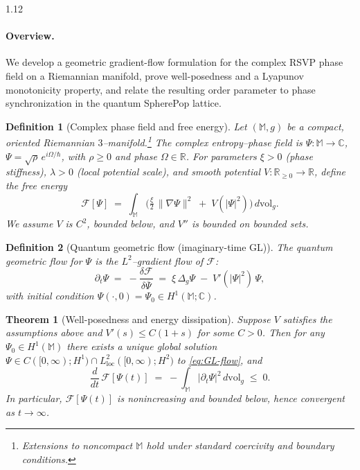 \documentclass[12pt,a4paper]{article}
\numberwithin{equation}{section}
\newtheorem{definition}{Definition}[section]
\newtheorem{theorem}{Theorem}[section]
\theoremstyle{remark}
\theoremstyle{definition}
\begin{document}
\begin{spacing}{1.12}
\paragraph{Overview.}
We develop a geometric gradient-flow formulation for the complex RSVP phase field on a Riemannian manifold, prove well-posedness and a Lyapunov monotonicity property, and relate the resulting order parameter to phase synchronization in the quantum SpherePop lattice.

\begin{definition}[Complex phase field and free energy]
Let $(\mathbb{M},g)$ be a compact, oriented Riemannian $3$–manifold.\footnote{Extensions to noncompact $\mathbb{M}$ hold under standard coercivity and boundary conditions.}
The \emph{complex entropy–phase field} is $\Psi:\mathbb{M}\to\mathbb{C}$, $\Psi=\sqrt{\rho}\,e^{i\Omega/\hbar}$, with $\rho\ge 0$ and phase $\Omega\in\mathbb{R}$.
For parameters $\xi>0$ (phase stiffness), $\lambda>0$ (local potential scale), and smooth potential $V:\mathbb{R}_{\ge 0}\to\mathbb{R}$, define the free energy
\begin{equation}
\label{eq:GL-free-energy}
\mathcal{F}[\Psi]\;=\;\int_{\mathbb{M}}\!\Big(\tfrac{\xi}{2}\,\|\nabla\Psi\|^2\;+\;V(|\Psi|^2)\Big)\,d\mathrm{vol}_g.
\end{equation}
We assume $V$ is $C^2$, bounded below, and $V''$ is bounded on bounded sets.
\end{definition}

\begin{definition}[Quantum geometric flow (imaginary-time GL)]
The \emph{quantum geometric flow} for $\Psi$ is the $L^2$–gradient flow of $\mathcal{F}$:
\begin{equation}
\label{eq:GL-flow}
\partial_t \Psi\;=\;-\frac{\delta\mathcal{F}}{\delta\overline{\Psi}}
\;=\;\xi\,\Delta_g \Psi\;-\;V'(|\Psi|^2)\,\Psi,
\end{equation}
with initial condition $\Psi(\cdot,0)=\Psi_0\in H^1(\mathbb{M};\mathbb{C})$.
\end{definition}

\begin{theorem}[Well-posedness and energy dissipation]
\label{thm:GL-wellposed}
Suppose $V$ satisfies the assumptions above and $V'(s)\le C(1+s)$ for some $C>0$.
Then for any $\Psi_0\in H^1(\mathbb{M})$ there exists a unique global solution $\Psi\in C([0,\infty);H^1)\cap L^2_{\mathrm{loc}}([0,\infty);H^2)$ to \eqref{eq:GL-flow}, and
\begin{equation}
\frac{d}{dt}\,\mathcal{F}[\Psi(t)]\;=\;-\int_{\mathbb{M}}\!\big|\partial_t \Psi\big|^2\,d\mathrm{vol}_g\;\le\;0.
\end{equation}
In particular, $\mathcal{F}[\Psi(t)]$ is nonincreasing and bounded below, hence convergent as $t\to\infty$.
\end{theorem}


\end{spacing}
\end{document}
